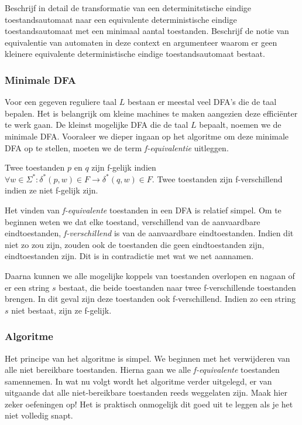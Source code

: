 \begin{question}
Beschrijf in detail de transformatie van een determinitstische eindige toestandsautomaat naar een equivalente deterministische eindige toestandsautomaat met een minimaal aantal toestanden. Beschrijf de notie van equivalentie van automaten in deze context en argumenteer waarom er geen kleinere equivalente deterministische eindige toestandsautomaat bestaat.
\end{question}

\subsubsection*{Minimale DFA}

Voor een gegeven reguliere taal $L$ bestaan er meestal veel DFA's die de taal bepalen. Het is belangrijk om kleine machines te maken aangezien deze effici\"enter te werk gaan. De kleinst mogelijke DFA die de taal $L$ bepaalt, noemen we de minimale DFA. Vooraleer we dieper ingaan op het algoritme om deze minimale DFA op te stellen, moeten we de term \textit{f-equivalentie} uitleggen.

\begin{theorem}[f-equivalentie]
	Twee toestanden $p$ en $q$ zijn f-gelijk indien $\forall w \in \Sigma^*:\delta^*(p,w) \in F \rightarrow \delta^*(q,w) \in F$. Twee toestanden zijn f-verschillend indien ze niet f-gelijk zijn.
\end{theorem}

Het vinden van \textit{f-equivalente} toestanden in een DFA is relatief simpel. Om te beginnen weten we dat elke toestand, verschillend van de aanvaardbare eindtoestanden, \textit{f-verschillend} is van de aanvaardbare eindtoestanden. Indien dit niet zo zou zijn, zouden ook de toestanden die geen eindtoestanden zijn, eindtoestanden zijn. Dit is in contradictie met wat we net aannamen.

Daarna kunnen we alle mogelijke koppels van toestanden overlopen en nagaan of er een string $s$ bestaat, die beide toestanden naar twee f-verschillende toestanden brengen. In dit geval zijn deze toestanden ook f-verschillend. Indien zo een string $s$ niet bestaat, zijn ze f-gelijk.

\subsubsection*{Algoritme}

Het principe van het algoritme is simpel. We beginnen met het verwijderen van alle niet bereikbare toestanden. Hierna gaan we alle \textit{f-equivalente} toestanden samennemen. In wat nu volgt wordt het algoritme verder uitgelegd, er van uitgaande dat alle niet-bereikbare toestanden reeds weggelaten zijn. Maak hier zeker oefeningen op! Het is praktisch onmogelijk dit goed uit te leggen als je het niet volledig snapt.

